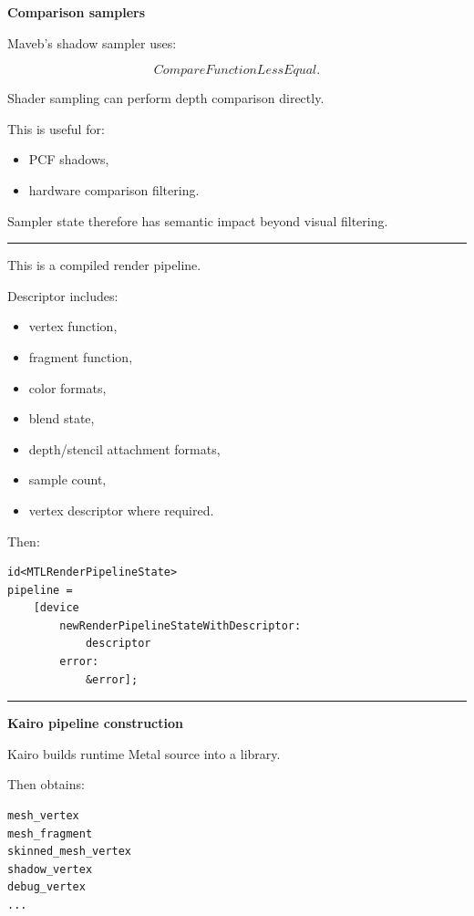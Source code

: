 \textbf{Comparison samplers}

Maveb's shadow sampler uses:

\[
CompareFunctionLessEqual.
\]

Shader sampling can perform depth comparison directly.

This is useful for:

\begin{itemize}
\tightlist
\item
  PCF shadows,
\item
  hardware comparison filtering.
\end{itemize}

Sampler state therefore has semantic impact beyond visual filtering.

\begin{center}\rule{0.5\linewidth}{0.5pt}\end{center}

\textbf{}

This is a compiled render pipeline.

Descriptor includes:

\begin{itemize}
\tightlist
\item
  vertex function,
\item
  fragment function,
\item
  color formats,
\item
  blend state,
\item
  depth/stencil attachment formats,
\item
  sample count,
\item
  vertex descriptor where required.
\end{itemize}

Then:

\begin{verbatim}
id<MTLRenderPipelineState>
pipeline =
    [device
        newRenderPipelineStateWithDescriptor:
            descriptor
        error:
            &error];
\end{verbatim}

\begin{center}\rule{0.5\linewidth}{0.5pt}\end{center}

\textbf{Kairo pipeline construction}

Kairo builds runtime Metal source into a library.

Then obtains:

\begin{verbatim}
mesh_vertex
mesh_fragment
skinned_mesh_vertex
shadow_vertex
debug_vertex
...
\end{verbatim}

